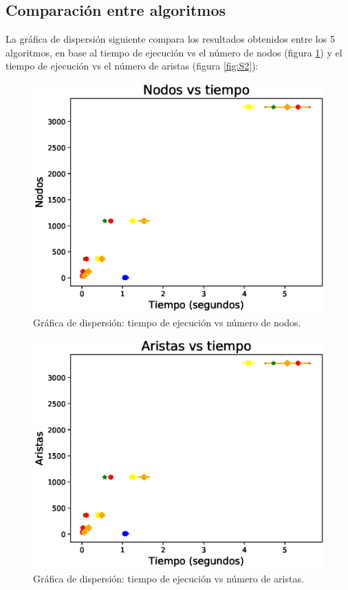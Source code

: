 \documentclass{article}
\begin{document}
\subsection{Comparación entre algoritmos}
La gráfica de dispersión siguiente compara los resultados obtenidos entre los 5 algoritmos, en base al tiempo de ejecución vs el número de nodos (figura \ref{fig:S1}) y el tiempo de ejecución vs el número de aristas (figura \ref{fig:S2}):

\begin{figure}[H]
    \includegraphics[width=\textwidth]{S1}
    \caption{Gráfica de dispersión: tiempo de ejecución vs número de nodos.}
    \label{fig:S1}
\end{figure}
\begin{figure}[H]
    \includegraphics[width=\textwidth]{S2}
    \caption{Gráfica de dispersión: tiempo de ejecución vs número de aristas.}
    \label{fig:52}
\end{figure}
\end{document}
